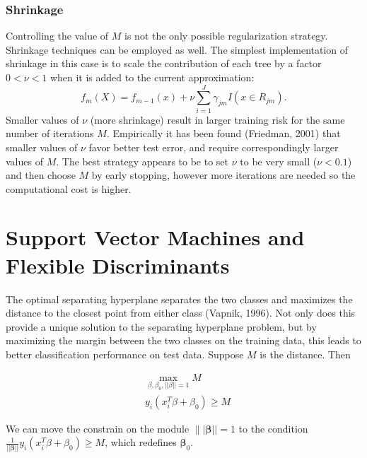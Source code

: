 \documentclass[12pt, letterpaper]{article}
\theoremstyle{definition}
\newcommand{\be}{\mathbf{\beta}}
\begin{document}
\subsubsection{Shrinkage}
Controlling the value of $M$ is not the only possible regularization strategy. Shrinkage techniques can be employed as well. The simplest implementation of shrinkage in this case is to scale the contribution of each tree by a factor $0<\nu<1$ when it is added to the current approximation:
\begin{equation}
f_m(X) = f_{m-1}(x) + \nu \sum_{i=1}^J \gamma_{jm}I(x \in R_{jm}).
\end{equation}
Smaller values of $\nu$ (more shrinkage) result in larger training risk for the same number of iterations $M$. Empirically it has been found (Friedman, 2001) that smaller values of $\nu$ favor better test error, and require correspondingly larger values of $M$. The best strategy appears to be to set $\nu$ to be very small ($\nu < 0.1$) and then choose $M$ by early stopping, however more iterations are needed so the computational cost is higher. 

\newpage
\section{Support Vector Machines and Flexible Discriminants}
The optimal separating hyperplane separates the two classes and maximizes the distance to the closest point from either class (Vapnik, 1996). Not only does this provide a unique solution to the separating hyperplane problem, but by maximizing the margin between the two classes on the training data, this leads to better classification performance on test data.
\iffalse
Suppose $M$ is the distance. Then

\begin{equation}
\begin{aligned}
&\max\limits_{\beta,\beta_0, ||\beta||=1} M \\
& y_i(x_i^T\beta + \beta_0) \ge M
\end{aligned}
\end{equation}

We  can move the constrain on the module $\||\be||=1$ to the condition $\frac{1}{||\be||}y_i(x_i^T\beta + \beta_0) \ge M$, which redefines $\be_0$. 
\end{document}
